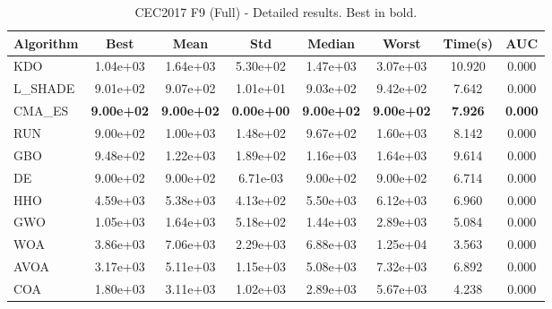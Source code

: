 \begin{table}[H]
\centering\small
\caption{CEC2017 F9 (Full) - Detailed results. Best in bold.}
\label{tab:cec2017_F9}
\begin{tabular}{lccccccc}
\toprule
\textbf{Algorithm} & \textbf{Best} & \textbf{Mean} & \textbf{Std} & \textbf{Median} & \textbf{Worst} & \textbf{Time(s)} & \textbf{AUC} \\
\midrule
KDO & 1.04e+03 & 1.64e+03 & 5.30e+02 & 1.47e+03 & 3.07e+03 & 10.920 & 0.000 \\
L_SHADE & 9.01e+02 & 9.07e+02 & 1.01e+01 & 9.03e+02 & 9.42e+02 & 7.642 & 0.000 \\
CMA_ES & \textbf{9.00e+02} & \textbf{9.00e+02} & \textbf{0.00e+00} & \textbf{9.00e+02} & \textbf{9.00e+02} & \textbf{7.926} & \textbf{0.000} \\
RUN & 9.00e+02 & 1.00e+03 & 1.48e+02 & 9.67e+02 & 1.60e+03 & 8.142 & 0.000 \\
GBO & 9.48e+02 & 1.22e+03 & 1.89e+02 & 1.16e+03 & 1.64e+03 & 9.614 & 0.000 \\
DE & 9.00e+02 & 9.00e+02 & 6.71e-03 & 9.00e+02 & 9.00e+02 & 6.714 & 0.000 \\
HHO & 4.59e+03 & 5.38e+03 & 4.13e+02 & 5.50e+03 & 6.12e+03 & 6.960 & 0.000 \\
GWO & 1.05e+03 & 1.64e+03 & 5.18e+02 & 1.44e+03 & 2.89e+03 & 5.084 & 0.000 \\
WOA & 3.86e+03 & 7.06e+03 & 2.29e+03 & 6.88e+03 & 1.25e+04 & 3.563 & 0.000 \\
AVOA & 3.17e+03 & 5.11e+03 & 1.15e+03 & 5.08e+03 & 7.32e+03 & 6.892 & 0.000 \\
COA & 1.80e+03 & 3.11e+03 & 1.02e+03 & 2.89e+03 & 5.67e+03 & 4.238 & 0.000 \\
\bottomrule
\end{tabular}
\end{table}
